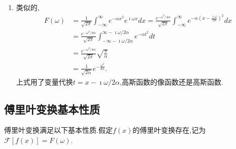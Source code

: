 \begin{solution}
\begin{enumerate}
    \item 类似的,  
    \begin{align}
        F(\omega) &=\frac{1}{\sqrt{2 \pi}} \int_{-\infty}^{\infty} e^{-\alpha x^2} e^{\imath \omega x} d x \nonumber
        = \frac{ e^{-\omega^2 / 4\alpha }}{\sqrt{2 \pi}} \int_{-\infty}^{\infty} e^{-\alpha  \left( x - \frac{\imath \omega}{2\alpha} \right)^2}  d x
        \nonumber
        \\
        & = \frac{ e^{-\omega^2 / 4\alpha }}{\sqrt{2 \pi}} \int_{-\infty - \imath \omega / 2\alpha}^{\infty - \imath \omega / 2\alpha} e^{-\alpha t^2} dt
        \nonumber
        \\
        & = \frac{ e^{-\omega^2 / 4\alpha }}{\sqrt{2 \pi}} \sqrt{\frac{\pi}{\alpha}} 
        \nonumber
        \\
            & = \frac{1}{\sqrt{2\alpha}} e^{- \frac{\omega^2}{4\alpha}} \nonumber .
    \end{align}
    上式用了变量代换$t = x - \imath \omega /2 \alpha$,高斯函数的像函数还是高斯函数.
\end{enumerate}
\end{solution}


\subsection{傅里叶变换基本性质}
傅里叶变换满足以下基本性质.假定$f(x)$的傅里叶变换存在,记为$\mathcal{F}[f(x)] = F(\omega)$.

